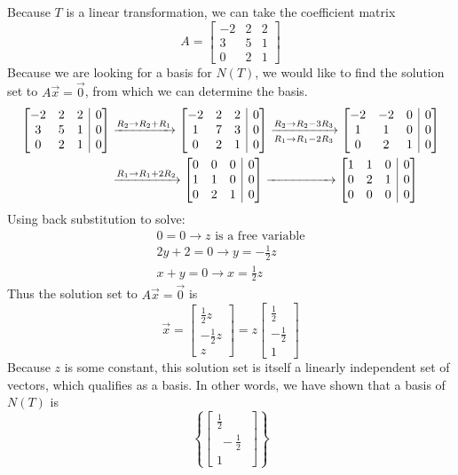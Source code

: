 \documentclass[]{article}
\makeatletter
\newenvironment{augmx}[1]{%
	\left[\begin{array}{@{}*{#1}{c}|c@{}}
	}{%
	\end{array}\right]
}
\newcommand{\bmat}[1]{\begin{bmatrix}#1\end{bmatrix}}
\makeatother
\begin{document}
\section{}
Because $T$ is a linear transformation, we can take the coefficient matrix
\[ A = \bmat{-2 & 2 & 2\\3 & 5 & 1\\0 & 2 & 1} \]
Because we are looking for a basis for $N(T)$, we would like to find the solution set to $A\vec{x} = \vec{0}$, from which we can determine the basis.\\
\begin{align*}
	\begin{augmx}{3}-2&2&2&0\\3&5&1&0\\0&2&1&0\end{augmx} &\xrightarrow{R_2\to R_2 + R_1}
	\begin{augmx}{3}-2 & 2 & 2 & 0\\1 & 7 & 3 & 0\\0 & 2 & 1 & 0\end{augmx} \xrightarrow[R_1\to R_1 - 2R_3]{R_2 \to R_2 - 3R_3} \begin{augmx}{3}-2 & -2 & 0 & 0\\1 & 1 & 0 & 0\\0 & 2 & 1 & 0\end{augmx}\\
	&\xrightarrow{R_1\to R_1 + 2R_2} \begin{augmx}{3}0&0&0&0\\1&1&0&0\\0&2&1&0\end{augmx}\xrightarrow{\hspace{5em}} \begin{augmx}{3}1&1&0&0\\0&2&1&0\\0&0&0&0\end{augmx}
\end{align*}
Using back substitution to solve:
\begin{align*}
	0 = 0 \rightarrow \text{$z$ is a free variable}\\
	2y+2 = 0 \rightarrow y = -\frac{1}{2}z\\
	x + y = 0 \rightarrow x = \frac{1}{2}z
\end{align*} 
Thus the solution set to $A\vec{x} = \vec{0}$ is
\[ \vec{x} = \bmat{\frac{1}{2}z\\ -\frac{1}{2}z\\z} = z\bmat{\frac{1}{2}\\-\frac{1}{2}\\1} \]
Because $z$ is some constant, this solution set is itself a linearly independent set of vectors, which qualifies as a basis. In other words, we have shown that a basis of $N(T)$ is
\[ \left\{ \bmat{ \frac{1}{2} \\ \; -\frac{1}{2} \; \\ 1} \right\} \]
\end{document}
